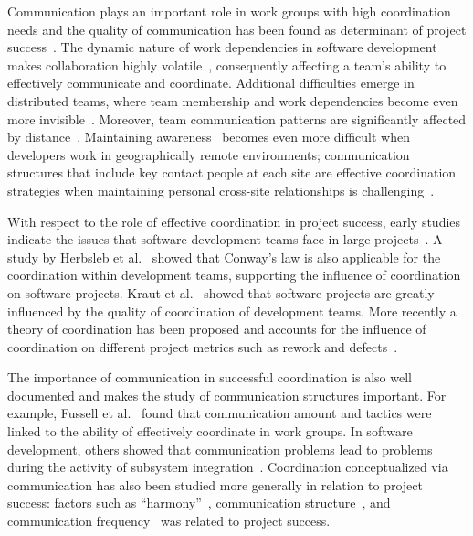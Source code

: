 Communication plays an important role in work groups with high coordination needs
and the quality of communication has been found as determinant of project
success~\cite{curtis:acm:1988,kraut:1995coordination}. The dynamic nature
of work dependencies in software development makes collaboration highly
volatile~\cite{Cataldo:2007hb}, consequently affecting a team's ability to
effectively communicate and coordinate. Additional difficulties emerge in
distributed teams, where team membership and work dependencies become even more
invisible~\cite{damian:icgse:2007}. Moreover, team communication patterns are
significantly affected by distance~\cite{hinds:cscw:2006}. Maintaining
awareness~\cite{sarma:2006icgse} becomes even more difficult when developers work
in geographically remote environments; communication structures that include key
contact people at each site are effective coordination strategies when
maintaining personal cross-site relationships is challenging~\cite{hinds:cscw:2006}.

With respect to the role of effective coordination in project success, early
studies indicate the issues that software development teams face in large
projects~\cite{curtis:acm:1988}. A study by Herbsleb et
al.~\cite{Herbsleb:1999ew} showed that Conway's law is also applicable for the
coordination within development teams, supporting the influence of coordination
on software projects. Kraut et al.~\cite{kraut:1995coordination} showed that
software projects are greatly influenced by the quality of coordination of
development teams. More recently a theory of coordination has been proposed and
accounts for the influence of coordination on different project metrics such as
rework and defects~\cite{Herbsleb:2006vn}.

The importance of communication in successful coordination is also well
documented and makes the study of communication structures important. For
example, Fussell et al.~\cite{fussell:cscw:1998} found that communication amount and
tactics were linked to the ability of effectively coordinate in work groups. In
software development, others showed that communication problems lead to problems
during the activity of subsystem
integration~\cite{Grinter:1999geography,deSouza2004:thwarts_collaboration}. Coordination
conceptualized via communication has also been studied more generally in relation
to project success: factors such as ``harmony''~\cite{Souder:1988jpim},
communication structure~\cite{Robin:1990jpim}, and communication
frequency~\cite{Griffin:1992ms} was related to project success.

